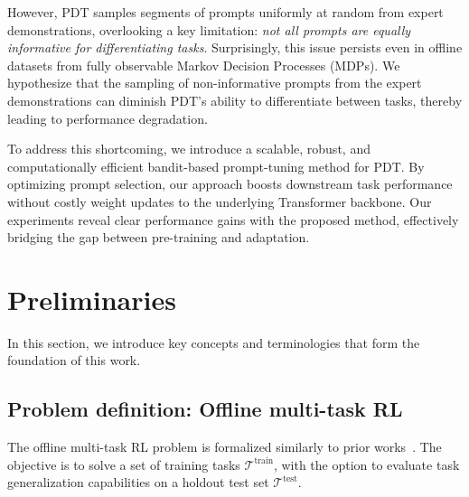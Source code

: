 \documentclass{article} %
\begin{document}
However, PDT samples segments of prompts uniformly at random from expert demonstrations, overlooking a key limitation: \textit{not all prompts are equally informative for differentiating tasks}. Surprisingly, this issue persists even in offline datasets from fully observable Markov Decision Processes (MDPs). 
We hypothesize that the sampling of non-informative prompts from the expert demonstrations can diminish PDT's ability to differentiate between tasks, thereby leading to performance degradation.

To address this shortcoming, we introduce a scalable, robust, and computationally efficient bandit-based prompt-tuning method for PDT. By optimizing prompt selection, our approach boosts downstream task performance without costly weight updates to the underlying Transformer backbone. Our experiments reveal clear performance gains with the proposed method, effectively bridging the gap between pre-training and adaptation.



\section{Preliminaries}
\label{sec:preliminaries}
In this section, we introduce key concepts and terminologies that form the foundation of this work.

\subsection{Problem definition: Offline multi-task RL}
The offline multi-task RL problem is formalized similarly to prior works~\citep{xu2022prompting, mitchell2021offline}. The objective is to solve a set of training tasks $\mathcal{T}^\text{train}$, with the option to evaluate task generalization capabilities on a holdout test set $\mathcal{T}^\text{test}$. 
\end{document}

